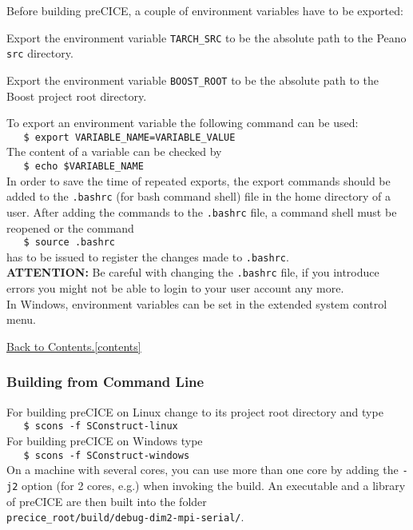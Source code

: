 \documentclass[11pt, oneside]{scrartcl}
\newcommand{\backtocontents}{\hyperref[contents]{Back to Contents.\ref*{contents}}}
\begin{document}
Before building preCICE, a couple of environment variables have to be exported:
\begin{itemize*}
\item Export the environment variable \texttt{TARCH\_SRC} to be the absolute
path to the Peano \verb$src$ directory.
\item Export the environment variable \texttt{BOOST\_ROOT} to be the absolute
path to the Boost project root directory.
\end{itemize*}
To export an environment variable the following command can be used: 
\\[2mm]
\verb|   $ export VARIABLE_NAME=VARIABLE_VALUE |
\\[2mm]
The content of a variable can be checked by
\\[2mm]
\verb|   $ echo $VARIABLE_NAME |
\\[2mm]
In order to save the time of repeated exports, the export commands should be
added to the \texttt{.bashrc} (for bash command shell) file in the home
directory of a user. After adding the commands to the \texttt{.bashrc} file, a
command shell must be reopened or the command
\\[2mm]
\verb|   $ source .bashrc |
\\[2mm]
has to be issued to register the changes made to \texttt{.bashrc}.        
\\[3mm]
\textbf{ATTENTION:} Be careful with changing the \texttt{.bashrc} file, if you
introduce errors you might not be able to login to your user account any more.
\\[3mm]
In Windows, environment variables can be set in the extended system control menu.

\backtocontents

\subsubsection{Building from Command Line}

For building preCICE on Linux change to its project root directory and type
\\[2mm] \verb|   $ scons -f SConstruct-linux| \\[2mm] For building preCICE on
Windows type \\[2mm] \verb|   $ scons -f SConstruct-windows| \\[2mm] On a
machine with several cores, you can use more than one core by adding the
\texttt{-j2} option (for 2 cores, e.g.) when invoking the build.
An executable and a library of preCICE are then built into the folder \\
\texttt{precice\_root/build/debug-dim2-mpi-serial/}.
\end{document}
